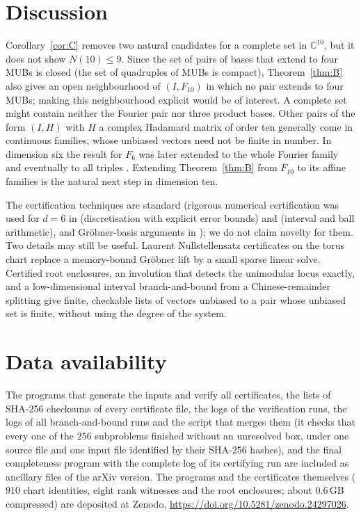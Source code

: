\documentclass[11pt]{article}
\theoremstyle{definition}
\theoremstyle{remark}
\newcommand{\C}{\mathbb{C}}
\begin{document}
\section{Discussion}\label{sec:discussion}
Corollary~\ref{cor:C} removes two natural candidates for a complete set in $\C^{10}$, but it does not show
$N(10)\le9$. Since the set of pairs of bases that extend to four MUBs is closed (the set of quadruples of MUBs is
compact), Theorem~\ref{thm:B} also gives an open neighbourhood of $(I,F_{10})$ in which no pair extends to four MUBs;
making this neighbourhood explicit would be of interest. A complete set might contain neither the Fourier pair nor three product bases. Other pairs of the form
$(I,H)$ with $H$ a complex Hadamard matrix of order ten generally come in continuous families, whose unbiased vectors
need not be finite in number. In dimension six the result for $F_6$ \cite{Grassl2004} was later extended to the whole Fourier family
\cite{JMMSW2009} and eventually to all triples \cite{CWT2026,Jaswal2026b}. Extending Theorem~\ref{thm:B} from
$F_{10}$ to its affine families is the natural next step in dimension ten.

The certification techniques are standard (rigorous numerical certification was used for $d=6$ in \cite{JMMSW2009}
(discretisation with explicit error bounds) and \cite{CWT2026} (interval and ball arithmetic), and Gröbner-basis
arguments in \cite{Grassl2004,MBGW2014}); we do not claim novelty for
them. Two details may still be useful. Laurent Nullstellensatz certificates on the torus chart replace a
memory-bound Gröbner lift by a small sparse linear solve. Certified root enclosures, an involution that detects the unimodular locus exactly, and a low-dimensional interval
branch-and-bound from a Chinese-remainder splitting give finite, checkable lists of vectors unbiased to a pair whose
unbiased set is finite, without using the degree of the system.

\section*{Data availability}
The programs that generate the inputs and verify all certificates, the lists of SHA-256 checksums of every
certificate file, the logs of the verification runs, the logs of all branch-and-bound runs and the script that merges
them (it checks that every one of the $256$ subproblems finished without an unresolved box, under one source file and
one input file identified by their SHA-256 hashes), and the final completeness program with the complete log of its
certifying run are included as ancillary files of the arXiv
version. The programs and the certificates themselves ($910$ chart identities, eight rank witnesses and the root
enclosures; about $0.6$\,GB compressed) are deposited at Zenodo, \url{https://doi.org/10.5281/zenodo.24297026}.
\end{document}
